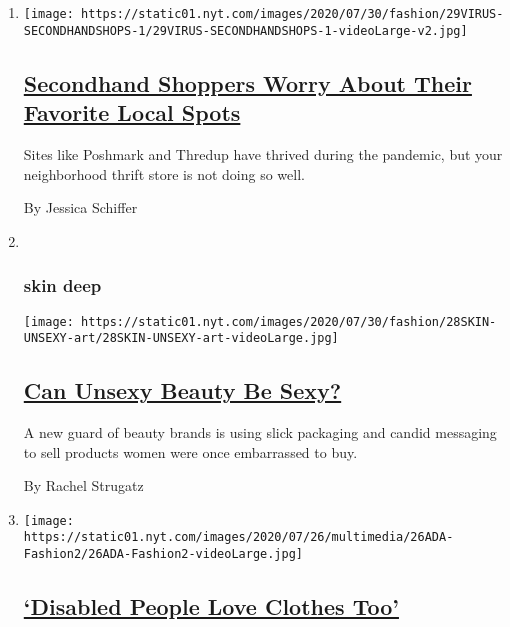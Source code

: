 \begin{enumerate}
\def\labelenumi{\arabic{enumi}.}
\item
  \texttt{[image: https://static01.nyt.com/images/2020/07/30/fashion/29VIRUS-SECONDHANDSHOPS-1/29VIRUS-SECONDHANDSHOPS-1-videoLarge-v2.jpg]}

  \hypertarget{secondhand-shoppers-worry-about-their-favorite-local-spots}{%
  \subsection{\texorpdfstring{\href{/2020/07/29/style/secondhand-clothes-coronavirus-safety.html}{Secondhand
  Shoppers Worry About Their Favorite Local
  Spots}}{Secondhand Shoppers Worry About Their Favorite Local Spots}}\label{secondhand-shoppers-worry-about-their-favorite-local-spots}}

  Sites like Poshmark and Thredup have thrived during the pandemic, but
  your neighborhood thrift store is not doing so well.

  By Jessica Schiffer
\item ~
  \hypertarget{skin-deep}{%
  \subsubsection{skin deep}\label{skin-deep}}

  \texttt{[image: https://static01.nyt.com/images/2020/07/30/fashion/28SKIN-UNSEXY-art/28SKIN-UNSEXY-art-videoLarge.jpg]}

  \hypertarget{can-unsexy-beauty-be-sexy}{%
  \subsection{\texorpdfstring{\href{/2020/07/28/style/can-unsexy-beauty-be-sexy.html}{Can
  Unsexy Beauty Be
  Sexy?}}{Can Unsexy Beauty Be Sexy?}}\label{can-unsexy-beauty-be-sexy}}

  A new guard of beauty brands is using slick packaging and candid
  messaging to sell products women were once embarrassed to buy.

  By Rachel Strugatz
\item
  \texttt{[image: https://static01.nyt.com/images/2020/07/26/multimedia/26ADA-Fashion2/26ADA-Fashion2-videoLarge.jpg]}

  \hypertarget{disabled-people-love-clothes-too}{%
  \subsection{\texorpdfstring{\href{/2020/07/26/style/functional-fashion.html}{`Disabled
  People Love Clothes
  Too'}}{`Disabled People Love Clothes Too'}}\label{disabled-people-love-clothes-too}}


\end{enumerate}
